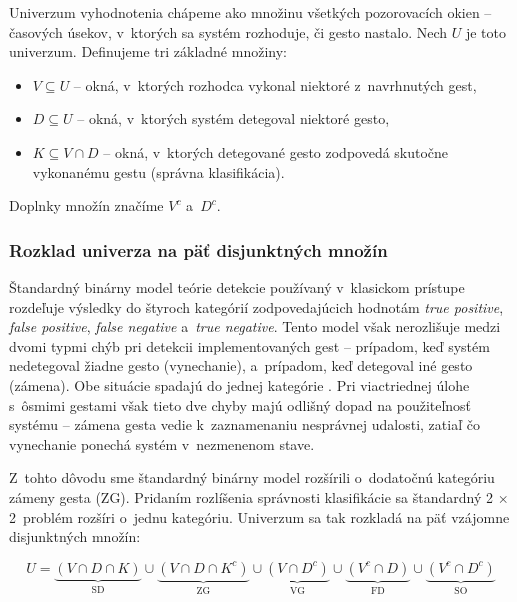 Univerzum vyhodnotenia chápeme ako množinu všetkých
pozorovacích okien -- časových úsekov, v~ktorých sa
systém rozhoduje, či gesto nastalo. Nech $U$ je toto
univerzum. Definujeme tri základné množiny:

\begin{itemize}
  \item $V \subseteq U$ -- okná, v~ktorých rozhodca
        vykonal niektoré z~navrhnutých gest,
  \item $D \subseteq U$ -- okná, v~ktorých systém
        detegoval niektoré gesto,
  \item $K \subseteq V \cap D$ -- okná, v~ktorých
        detegované gesto zodpovedá skutočne vykonanému
        gestu (správna klasifikácia).
\end{itemize}

\noindent Doplnky množín značíme $V^c$ a~$D^c$.

\subsubsection{Rozklad univerza na päť disjunktných množín}
\label{subsubsec:rozklad-univerza}

Štandardný binárny model teórie detekcie používaný
v~klasickom prístupe~\cite{dp-balla} rozdeľuje výsledky
do štyroch kategórií zodpovedajúcich hodnotám
\textit{true positive}, \textit{false positive},
\textit{false negative} a~\textit{true negative}.
Tento model však nerozlišuje medzi dvomi typmi chýb
pri detekcii implementovaných gest -- prípadom, keď systém
nedetegoval žiadne gesto (vynechanie), a~prípadom, keď
detegoval iné gesto (zámena). Obe situácie spadajú do
jednej kategórie . Pri viactriednej
úlohe s~ôsmimi gestami však tieto dve chyby majú odlišný
dopad na použiteľnosť systému -- zámena gesta vedie
k~zaznamenaniu nesprávnej udalosti, zatiaľ čo vynechanie
ponechá systém v~nezmenenom stave.

Z~tohto dôvodu sme štandardný binárny model rozšírili
o~dodatočnú kategóriu zámeny gesta (ZG). Pridaním rozlíšenia
správnosti klasifikácie sa štandardný 2 $\times$ 2~problém
rozšíri o~jednu kategóriu. Univerzum sa tak rozkladá na
päť vzájomne disjunktných množín:

\begin{equation}
  U = \underbrace{(V \cap D \cap K)}_{\text{SD}}
  \cup \underbrace{(V \cap D \cap K^c)}_{\text{ZG}}
  \cup \underbrace{(V \cap D^c)}_{\text{VG}}
  \cup \underbrace{(V^c \cap D)}_{\text{FD}}
  \cup \underbrace{(V^c \cap D^c)}_{\text{SO}}
\end{equation}

